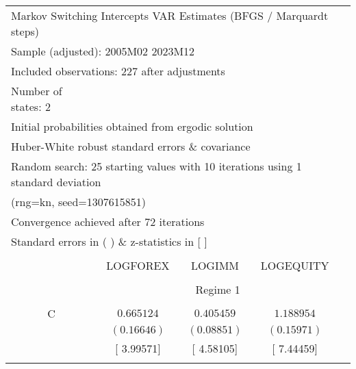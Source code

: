 \begin{tabular}{lrrrr}
\multicolumn{5}{l}{Markov Switching Intercepts VAR Estimates (BFGS / Marquardt steps)}\\
\multicolumn{3}{l}{Sample (adjusted): 2005M02 2023M12}&\multicolumn{1}{c}{}&\multicolumn{1}{c}{}\\
\multicolumn{3}{l}{Included observations: 227 after adjustments}&\multicolumn{1}{c}{}&\multicolumn{1}{c}{}\\
\multicolumn{1}{l}{Number of states: 2}&\multicolumn{1}{c}{}&\multicolumn{1}{c}{}&\multicolumn{1}{c}{}&\multicolumn{1}{c}{}\\
\multicolumn{4}{l}{Initial probabilities obtained from ergodic solution}&\multicolumn{1}{c}{}\\
\multicolumn{4}{l}{Huber-White robust standard errors \& covariance}&\multicolumn{1}{c}{}\\
\multicolumn{6}{l}{Random search: 25 starting values with 10 iterations using 1 standard deviation}\\
\multicolumn{2}{l}{(rng=kn, seed=1307615851)}&\multicolumn{1}{c}{}&\multicolumn{1}{c}{}&\multicolumn{1}{c}{}\\
\multicolumn{3}{l}{Convergence achieved after 72 iterations}&\multicolumn{1}{c}{}&\multicolumn{1}{c}{}\\
\multicolumn{3}{l}{Standard errors in ( ) \& z-statistics in [ ]}&\multicolumn{1}{c}{}&\multicolumn{1}{c}{}\\
[4.5pt] \hline \\ [-4.5pt]
\multicolumn{1}{c}{}&\multicolumn{1}{c}{LOGFOREX}&\multicolumn{1}{c}{LOGIMM}&\multicolumn{1}{c}{LOGEQUITY}&\multicolumn{1}{c}{}\\
[4.5pt] \hline \\ [-4.5pt]
\multicolumn{1}{c}{}&\multicolumn{3}{c}{Regime 1}&\multicolumn{1}{c}{}\\
[4.5pt] \hline \\ [-4.5pt]
\multicolumn{1}{c}{C}&\multicolumn{1}{c}{$0.665124$}&\multicolumn{1}{c}{$0.405459$}&\multicolumn{1}{c}{$1.188954$}&\multicolumn{1}{c}{}\\
\multicolumn{1}{c}{}&\multicolumn{1}{c}{$(0.16646)$}&\multicolumn{1}{c}{$(0.08851)$}&\multicolumn{1}{c}{$(0.15971)$}&\multicolumn{1}{c}{}\\
\multicolumn{1}{c}{}&\multicolumn{1}{c}{[ 3.99571]}&\multicolumn{1}{c}{[ 4.58105]}&\multicolumn{1}{c}{[ 7.44459]}&\multicolumn{1}{c}{}\\
\multicolumn{1}{c}{}&\multicolumn{1}{c}{}&\multicolumn{1}{c}{}&\multicolumn{1}{c}{}&\multicolumn{1}{c}{}\\

\end{tabular}
